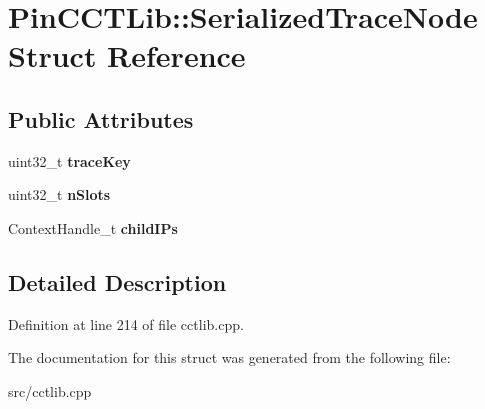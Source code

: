 \hypertarget{structPinCCTLib_1_1SerializedTraceNode}{\section{Pin\-C\-C\-T\-Lib\-:\-:Serialized\-Trace\-Node Struct Reference}
\label{structPinCCTLib_1_1SerializedTraceNode}
}
\subsection*{Public Attributes}
\begin{DoxyCompactItemize}
\item 
\hypertarget{structPinCCTLib_1_1SerializedTraceNode_a60a0a2c5a7e9e5852a15e37819c73be4}{uint32\-\_\-t {\bfseries trace\-Key}}\label{structPinCCTLib_1_1SerializedTraceNode_a60a0a2c5a7e9e5852a15e37819c73be4}

\item 
\hypertarget{structPinCCTLib_1_1SerializedTraceNode_ab29f5cc5d6c10e45f7caf8aaa2bbcf4c}{uint32\-\_\-t {\bfseries n\-Slots}}\label{structPinCCTLib_1_1SerializedTraceNode_ab29f5cc5d6c10e45f7caf8aaa2bbcf4c}

\item 
\hypertarget{structPinCCTLib_1_1SerializedTraceNode_ae99a5e28925c563d7b4f070aa9240d95}{Context\-Handle\-\_\-t {\bfseries child\-I\-Ps}}\label{structPinCCTLib_1_1SerializedTraceNode_ae99a5e28925c563d7b4f070aa9240d95}

\end{DoxyCompactItemize}


\subsection{Detailed Description}


Definition at line 214 of file cctlib.\-cpp.



The documentation for this struct was generated from the following file\-:\begin{DoxyCompactItemize}
\item 
src/cctlib.\-cpp\end{DoxyCompactItemize}
